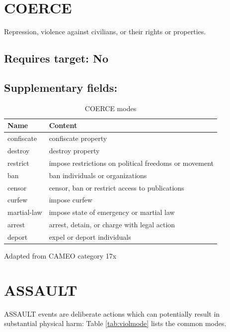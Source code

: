 \documentclass[11pt]{report}
\newcommand{\plcat}[1]{\textsf{#1}}
\begin{document}
\newpage  

\section{COERCE}

Repression, violence against civilians, or their rights or properties.

\subsection{Requires target: No}

\subsection{Supplementary fields: }

\begin{table}[htp]
\caption{COERCE modes}
\begin{center}
\begin{tabular}{|l|l|}
\hline
Name & Content \\
\hline
confiscate & confiscate property \\
destroy & destroy property \\
restrict & impose restrictions on political freedoms or movement \\
ban & ban individuals or organizations \\
censor & censor, ban or restrict access to publications  \\
curfew & impose curfew \\
martial-law & impose state of emergency or martial law \\
arrest & arrest, detain, or charge with legal action \\
deport & expel or deport individuals \\
\hline
\end{tabular}
\end{center}
\label{tab:coerce}
Adapted from CAMEO category 17x
\end{table}%

\newpage  


\section{ASSAULT}

\plcat{ASSAULT} events are deliberate actions which can potentially result in substantial physical harm: Table \ref{tab:violmode} lists the common modes.
\end{document}
